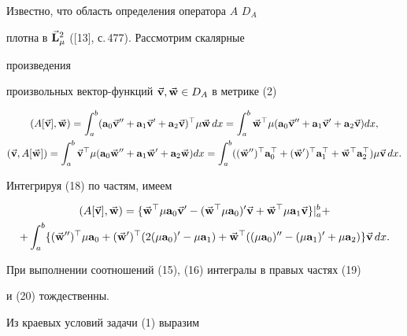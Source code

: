  


\begin{pf} Известно, что область определения оператора $A$\; $D_A$ 


плотна в $\Vec{\bold{L}}^2_\mu$ ([13], с.\,477). Рассмотрим скалярные 


произведения 


произвольных вектор-функций $\Vec{\bold{v}},\Vec{\bold{w}}\in D_A$ в метрике (2) 


\begin{gather} 


(A[\vb{v}],\vb{w})=\int^b_a(\bold a_0\vb{v}''+\bold a_1\vb{v}'+ 


\bold a_2\vb{v})^\top\mu\vb{w}\,dx=\int^b_a\vb{w}^\top\mu 


(\bold a_0\vb{v}''+\bold a_1\vb{v}'+\bold a_2\vb{v})dx,\\ 


% 


(\vb{v},A[\vb{w}])=\int^b_a\vb{v}^\top\mu(\bold a_0\vb{w}''+ 


\bold a_1\vb{w}'+\bold a_2\vb{w})dx=\int^b_a 


((\vb{w}'')^\top\bold a^\top_0+(\vb{w}')^\top 


\bold a^\top_1+\vb{w}^\top\bold a^\top_2)\mu\vb{v}\,dx. 


\end{gather} 


Интегрируя (18) по частям, имеем 


\begin{multline} 


(A[\vb{v}],\vb{w})=\{\vb{w}^\top\mu\bold a_0\vb{v}'- 


(\vb{w}^\top\mu\bold a_0)'\vb{v}+\vb{w}^\top\mu\bold a_1\vb{v}\} 


|^b_a+ \\ 


% 


+\int^b_a\{(\vb{w}'')^\top\mu\bold a_0+(\vb{w}')^\top 


(2(\mu\bold a_0)'-\mu\bold a_1)+\vb{w}^\top((\mu\bold a_0)''- 


(\mu\bold a_1)'+\mu\bold a_2)\}\vb{v}\,dx. 


\end{multline} 


При выполнении соотношений (15), (16) интегралы в правых частях (19) 


и (20) тождественны. 


 


Из краевых условий задачи (1) выразим



\end{pf}
